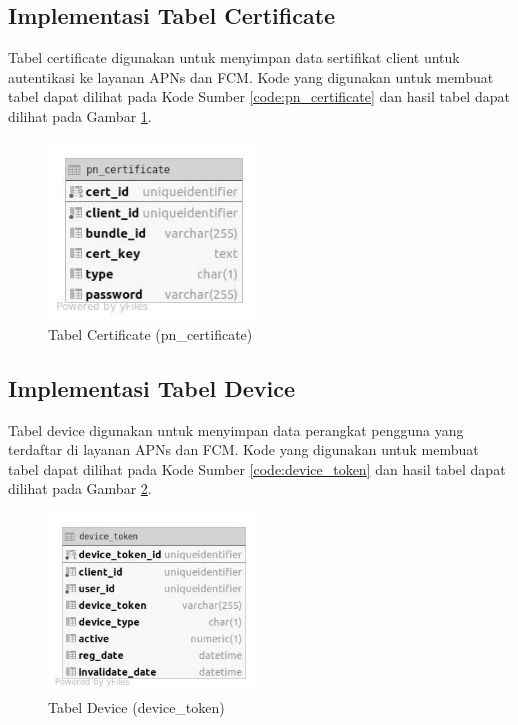 \subsection{Implementasi Tabel Certificate}
\par Tabel certificate digunakan untuk menyimpan data sertifikat client untuk autentikasi ke layanan APNs dan FCM. Kode yang digunakan untuk membuat tabel dapat dilihat pada Kode Sumber \ref{code:pn_certificate} dan hasil tabel dapat dilihat pada Gambar \ref{tabel_pn_certificate}.

\begin{figure}[H]
	\caption{Tabel Certificate (pn\_certificate)}
	\label{tabel_pn_certificate}
    \centering\includegraphics[width=0.5\textwidth]{bab4/figures/tabel_pn_certificate.jpg}
\end{figure}

\subsection{Implementasi Tabel Device}
\par Tabel device digunakan untuk menyimpan data perangkat pengguna yang terdaftar di layanan APNs dan FCM. Kode yang digunakan untuk membuat tabel dapat dilihat pada Kode Sumber \ref{code:device_token} dan hasil tabel dapat dilihat pada Gambar \ref{tabel_device_token}.

\begin{figure}[H]
	\caption{Tabel Device (device\_token)}
	\label{tabel_device_token}
    \centering\includegraphics[width=0.5\textwidth]{bab4/figures/tabel_device_token.jpg}
\end{figure}


